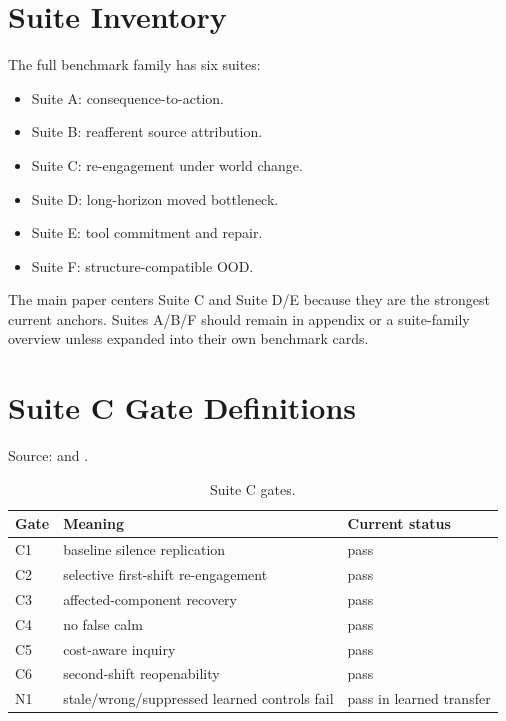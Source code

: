 \section{Suite Inventory}

The full benchmark family has six suites:
\begin{itemize}
  \item Suite A: consequence-to-action.
  \item Suite B: reafferent source attribution.
  \item Suite C: re-engagement under world change.
  \item Suite D: long-horizon moved bottleneck.
  \item Suite E: tool commitment and repair.
  \item Suite F: structure-compatible OOD.
\end{itemize}

The main paper centers Suite C and Suite D/E because they are the strongest
current anchors. Suites A/B/F should remain in appendix or a suite-family
overview unless expanded into their own benchmark cards.

\section{Suite C Gate Definitions}

Source:
and
.

\begin{table}[h]
\centering
\small
\begin{tabular}{lll}
\toprule
Gate & Meaning & Current status \\
\midrule
C1 & baseline silence replication & pass \\
C2 & selective first-shift re-engagement & pass \\
C3 & affected-component recovery & pass \\
C4 & no false calm & pass \\
C5 & cost-aware inquiry & pass \\
C6 & second-shift reopenability & pass \\
N1 & stale/wrong/suppressed learned controls fail & pass in learned transfer \\
\bottomrule
\end{tabular}
\caption{Suite C gates.}
\end{table}

